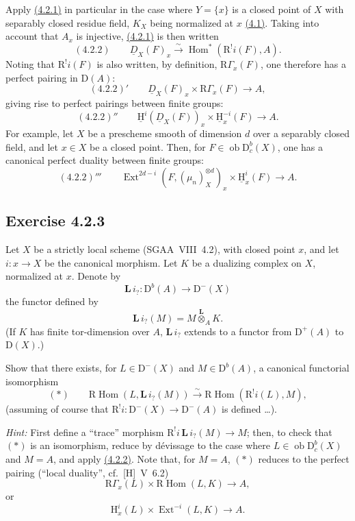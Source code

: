 \documentclass[11pt]{article}
\providecommand{\uH}{\underline{\mathrm H}}
\renewcommand{\H}{\mathrm{H}}
\DeclareMathOperator{\Hom}{Hom}
\DeclareMathOperator{\Ext}{Ext}
\newcommand{\R}{\mathrm{R}}
\newcommand{\D}{\mathrm{D}}
\newcommand{\ob}{\operatorname{ob}}
\providecommand{\Hom}{\operatorname{Hom}}
\providecommand{\ob}{\operatorname{ob}}
\providecommand{\R}{\mathrm R}
\providecommand{\Hom}{\operatorname{Hom}}
\begin{document}
Apply \hyperref[sga5:I:equation:4.2.1]{(4.2.1)} in particular in the case where $Y=\{x\}$ is a closed point of $X$ with separably closed residue field, $K_X$ being normalized at $x$ \hyperref[sga5:I:equation:4.1]{(4.1)}. Taking into account that $A_x$ is injective, \hyperref[sga5:I:equation:4.2.1]{(4.2.1)} is then written
\label{sga5:I:equation:4.2.2}\[
(4.2.2)\qquad \underline{D}_X(F)_x\xrightarrow{\sim}\Hom^*(\R^{!}i(F),A).
\]
Noting that $\R^{!}i(F)$ is also written, by definition, $\R\Gamma_x(F)$, one therefore has a perfect pairing in $\D(A)$:
\label{sga5:I:equation:4.2.2:2}\[
(4.2.2)'\qquad \underline{D}_X(F)_x\times \R\Gamma_x(F)\longrightarrow A,
\]
giving rise to perfect pairings between finite groups:
\label{sga5:I:equation:4.2.2:3}\[
(4.2.2)''\qquad \uH^i(\underline{D}_X(F))_x\times \uH_x^{-i}(F)\longrightarrow A.
\]
For example, let $X$ be a prescheme smooth of dimension $d$ over a separably closed field, and let $x\in X$ be a closed point. Then, for $F\in\ob\D_c^b(X)$, one has a canonical perfect duality between finite groups:
\label{sga5:I:equation:4.2.2:4}\[
(4.2.2)'''\qquad \Ext^{2d-i}(F,(\mu_n)_X^{\otimes d})_x\times \uH_x^i(F)\longrightarrow A.
\]

\subsection*{Exercise 4.2.3}\label{sga5:I:exercise:4.2.3}
Let $X$ be a strictly local scheme (SGAA~VIII~4.2), with closed point $x$, and let $i:x\to X$ be the canonical morphism. Let $K$ be a dualizing complex on $X$, normalized at $x$. Denote by
\[
\mathbf L\, i_? : \D^b(A)\longrightarrow \D^-(X)
\]
the functor defined by
\[
\mathbf L\, i_?(M)=M\overset{\mathbf L}{\otimes}_A K.
\]
(If $K$ has finite tor-dimension over $A$, $\mathbf L\, i_?$ extends to a functor from $\D^+(A)$ to $\D(X)$.)

Show that there exists, for $L\in\D^-(X)$ and $M\in\D^b(A)$, a canonical functorial isomorphism
\[
(*)\qquad \R\Hom(L,\mathbf L\, i_?(M))\xrightarrow{\sim}\R\Hom(\R^{!}i(L),M),
\]
(assuming of course that $\R^{!}i:\D^-(X)\to\D^-(A)$ is defined \dots).

\emph{Hint:} First define a ``trace'' morphism $\R^{!}i\,\mathbf L\, i_?(M)\to M$; then, to check that $(*)$ is an isomorphism, reduce by dévissage to the case where $L\in\ob\D_c^b(X)$ and $M=A$, and apply \hyperref[sga5:I:equation:4.2.2]{(4.2.2)}. Note that, for $M=A$, $(*)$ reduces to the perfect pairing (``local duality'', cf.~[H]~V~6.2)
\[
\R\Gamma_x(L)\times \R\Hom(L,K)\longrightarrow A,
\]
or
\[
\H_x^i(L)\times \Ext^{-i}(L,K)\longrightarrow A.
\]
\end{document}
